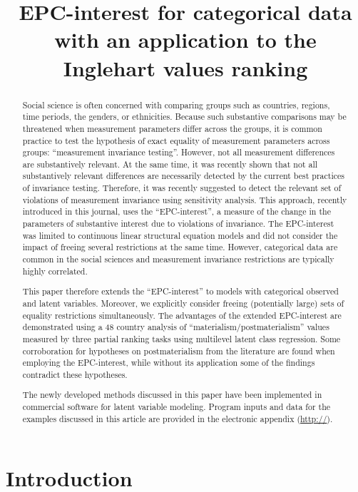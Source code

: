 \documentclass[letterpaper,12pt]{article}
\title{EPC-interest for categorical data with an application to the Inglehart values ranking}
\date{}
\author{\;}
\begin{document}
\maketitle



\begin{abstract}
Social science is often concerned with comparing groups such as countries, regions, time periods, the genders, or ethnicities.
Because such substantive comparisons may be threatened when measurement parameters differ across the groups, it is common practice to test the hypothesis of exact equality of measurement parameters across groups:  ``measurement invariance testing''. However, not all measurement differences are substantively relevant. At the same time, it was recently shown that not all substantively relevant differences are necessarily detected by the current best practices of invariance testing. Therefore, it was recently suggested to detect the relevant set of violations of measurement invariance using sensitivity analysis. This approach, recently introduced in this journal, uses the ``EPC-interest'',  a measure of the change in the parameters of substantive interest due to violations of invariance. The EPC-interest was limited to continuous linear structural equation models and did not consider the impact of freeing several restrictions at the same time. However, categorical data are common in the social sciences and measurement invariance restrictions are typically highly correlated.

This paper therefore extends the ``EPC-interest'' to models with categorical observed and latent variables. Moreover, we explicitly consider freeing (potentially large) sets of equality restrictions simultaneously. The advantages of the extended EPC-interest are demonstrated using a 48 country analysis of ``materialism/postmaterialism'' values measured by three partial ranking tasks using multilevel latent class regression. Some corroboration for hypotheses on postmaterialism from the literature are found when employing the EPC-interest, while without its application some of the findings contradict these hypotheses.

The newly developed methods discussed in this paper have been implemented in commercial software for latent variable modeling. Program inputs and data for the examples discussed in this article are provided in the electronic appendix (\url{http://}).
\end{abstract}

\section{Introduction}
\end{document}

